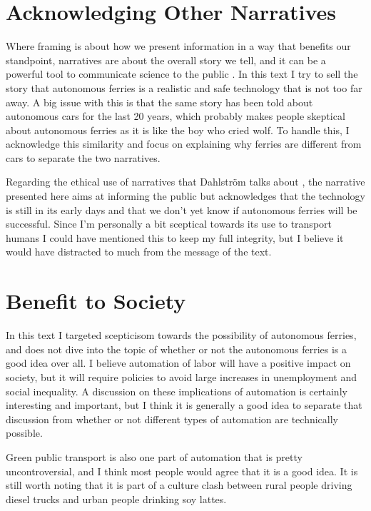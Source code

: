 \documentclass{iopconfser}
\begin{document}
\section*{Acknowledging Other Narratives}
Where framing is about how we present information in a way that benefits our standpoint, narratives are about the overall story we tell, and it can be a powerful tool to communicate science to the public \cite{dahlstromUsingNarrativesStorytelling2014}.
In this text I try to sell the story that autonomous ferries is a realistic and safe technology that is not too far away.
A big issue with this is that the same story has been told about autonomous cars for the last 20 years, which probably makes people skeptical about autonomous ferries as it is like the boy who cried wolf.
To handle this, I acknowledge this similarity and focus on explaining why ferries are different from cars to separate the two narratives.

Regarding the ethical use of narratives that Dahlström talks about \cite{dahlstromUsingNarrativesStorytelling2014}, the narrative presented here aims at informing the public but acknowledges that the technology is still in its early days and that we don't yet know if autonomous ferries will be successful.
Since I'm personally a bit sceptical towards its use to transport humans I could have mentioned this to keep my full integrity, but I believe it would have distracted to much from the message of the text.


\section*{Benefit to Society}
In this text I targeted scepticisom towards the possibility of autonomous ferries, and does not dive into the topic of whether or not the autonomous ferries is a good idea over all.
I believe automation of labor will have a positive impact on society, but it will require policies to avoid large increases in unemployment and social inequality.
A discussion on these implications of automation is certainly interesting and important, but I think it is generally a good idea to separate that discussion from whether or not different types of automation are technically possible.

Green public transport is also one part of automation that is pretty uncontroversial, and I think most people would agree that it is a good idea.
It is still worth noting that it is part of a culture clash between rural people driving diesel trucks and urban people drinking soy lattes.
\end{document}
